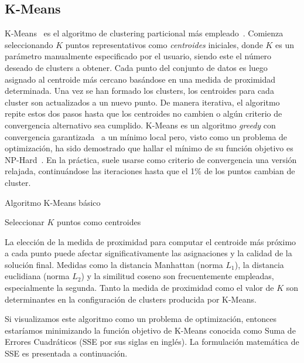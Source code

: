 \subsection{K-Means}\label{subsec:k-means}

K-Means~\cite{MacQueen67} es el algoritmo de clustering particional más empleado~\cite{Aggarawal13}.
Comienza seleccionando $K$ puntos representativos como \textit{centroides} iniciales, donde $K$ es un parámetro manualmente especificado por el usuario, siendo este el número deseado de clusters a obtener.
Cada punto del conjunto de datos es luego asignado al centroide más cercano basándose en una medida de proximidad determinada.
Una vez se han formado los clusters, los centroides para cada cluster son actualizados a un nuevo punto.
De manera iterativa, el algoritmo repite estos dos pasos hasta que los centroides no cambien o algún criterio de convergencia alternativo sea cumplido.
K-Means es un algoritmo \textit{greedy} con convergencia garantizada~\cite{Selim84} a un mínimo local pero, visto como un problema de optimización, ha sido demostrado que hallar el mínimo de su función objetivo es NP-Hard~\cite{Manning08}.
En la práctica, suele usarse como criterio de convergencia una versión relajada, continuándose las iteraciones hasta que el 1\% de los puntos cambian de cluster.

\begin{algorithm}
    \caption{Algoritmo K-Means básico}
    \label{algorithm:KMeans}
    Seleccionar $K$ puntos como centroides\;
\end{algorithm}

La elección de la medida de proximidad para computar el centroide más próximo a cada punto puede afectar significativamente las asignaciones y la calidad de la solución final.
Medidas como la distancia Manhattan (norma $L_1$), la distancia euclidiana (norma $L_2$) y la similitud coseno son frecuentemente empleadas, especialmente la segunda.
Tanto la medida de proximidad como el valor de $K$ son determinantes en la configuración de clusters producida por K-Means.

Si visualizamos este algoritmo como un problema de optimización, entonces estaríamos minimizando la función objetivo de K-Means conocida como Suma de Errores Cuadráticos (SSE por sus siglas en inglés).
La formulación matemática de SSE es presentada a continuación.

